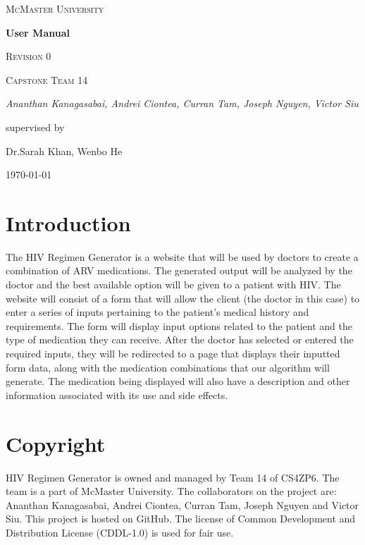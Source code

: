 \documentclass[12pt]{article}
\begin{document}
\begin{titlepage}
	\centering
	{\scshape\LARGE McMaster University \par}
	\vspace{1.5cm}
	{\huge\bfseries User Manual \par}
	{\scshape\Large Revision 0 \par}

	\vspace{1cm}
	{\scshape\Large Capstone Team 14\par}
	{\Large\itshape Ananthan Kanagasabai, Andrei Ciontea, Curran Tam, Joseph Nguyen, Victor Siu \par}
	\vspace{3cm}
	\vfill
	supervised by\par
	Dr.Sarah Khan, Wenbo He

	\vfill
	{\large \today\par}
\end{titlepage}

\newpage

\tableofcontents
\listoffigures
\newpage


\section{Introduction}
The HIV Regimen Generator is a website that will be used by doctors to create a combination of ARV medications. The generated output will be analyzed by the doctor and the best available option will be given to a patient with HIV. The website will consist of a form that will allow the client (the doctor in this case) to enter a series of inputs pertaining to the patient's medical history and requirements. The form will display input options related to the patient and the type of medication they can receive. After the doctor has selected or entered the required inputs, they will be redirected to a page that displays their inputted form data, along with the medication combinations that our algorithm will generate. The medication being displayed will also have a description and other information associated with its use and side effects.

\section{Copyright}
HIV Regimen Generator is owned and managed by Team 14 of CS4ZP6. The team is a part of McMaster University. The collaborators on the project are: Ananthan Kanagasabai, Andrei Ciontea, Curran Tam, Joseph Nguyen and Victor Siu. This project is hosted on GitHub. The license of Common Development and Distribution License (CDDL-1.0) is used for fair use.
\end{document}
